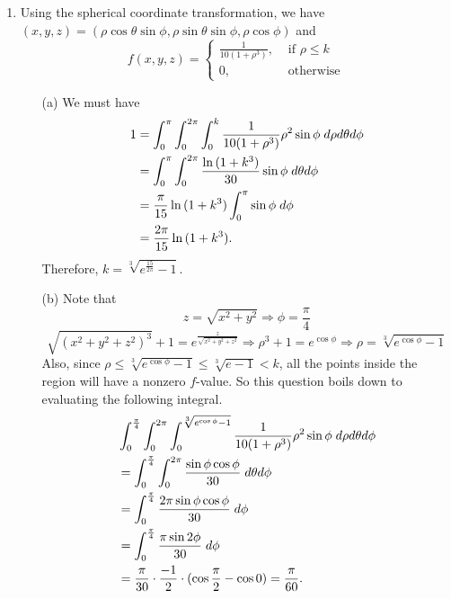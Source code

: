 \documentclass{article}
\begin{document}
\begin{enumerate}
    \newpage
    \item Using the spherical coordinate transformation, we have $(x,y,z) = (\rho\cos\theta\sin\phi, \rho\sin\theta\sin\phi, \rho\cos\phi)$ and
    \[f(x,y,z)=\begin{cases}
        \frac{1}{10(1+\rho^3)},& \text{ if } \rho \le k\\
        0, &\text{ otherwise}
    \end{cases}\]
    
    
    \begin{enumerate}
        \item[(a)] We must have
        \begin{align*}
            1 &= \int_0^\pi \int_0^{2\pi} \int_0^k \frac{1}{10(1+\rho^3)} \rho^2\sin\phi\hspace{1mm}d\rho d\theta d\phi\\
            &= \int_0^\pi \int_0^{2\pi} \frac{\ln{(1+k^3)}}{30} \sin\phi\hspace{1mm}d\theta d\phi\\
            &= \frac{\pi}{15}\ln{(1+k^3)} \int_0^\pi \sin\phi\hspace{1mm}d\phi\\
            &= \frac{2\pi}{15}\ln{(1+k^3)}.
        \end{align*}
        Therefore, $k=\sqrt[3]{e^\frac{15}{2\pi} - 1}$.
        \vspace{1cm}
        \item[(b)] Note that
        \[z=\sqrt{x^2+y^2} \Rightarrow \phi=\frac{\pi}{4}\]\[\sqrt{(x^2+y^2+z^2)^3}+1=e^\frac{z}{\sqrt{x^2+y^2+z^2}} \Rightarrow \rho^3 + 1 = e^{\cos\phi} \Rightarrow \rho = \sqrt[3]{e^{\cos\phi} - 1}\]
        Also, since $\rho \le \sqrt[3]{e^{\cos\phi} - 1} \le \sqrt[3]{e - 1} < k$, all the points inside the region will %
        have a nonzero $f$-value. So this question boils down to evaluating the following integral.
        \begin{align*}
            &\int_0^{\frac{\pi}{4}} \int_0^{2\pi} \int_0^{\sqrt[3]{e^{\cos\phi} - 1}} \frac{1}{10(1+\rho^3)} \rho^2\sin\phi\hspace{1mm}d\rho d\theta d\phi\\
            &= \int_0^{\frac{\pi}{4}} \int_0^{2\pi} \frac{\sin\phi\cos\phi}{30} \hspace{1mm}d\theta d\phi\\
            &= \int_0^{\frac{\pi}{4}} \frac{2\pi\sin\phi\cos\phi}{30} \hspace{1mm}d\phi\\
            &= \int_0^{\frac{\pi}{4}} \frac{\pi\sin{2\phi}}{30} \hspace{1mm}d\phi\\
            &= \frac{\pi}{30}\cdot\frac{-1}{2}\cdot(\cos\frac{\pi}{2}-\cos 0) = \frac{\pi}{60}.
        \end{align*}
    \end{enumerate}
    

\end{enumerate}
\end{document}
